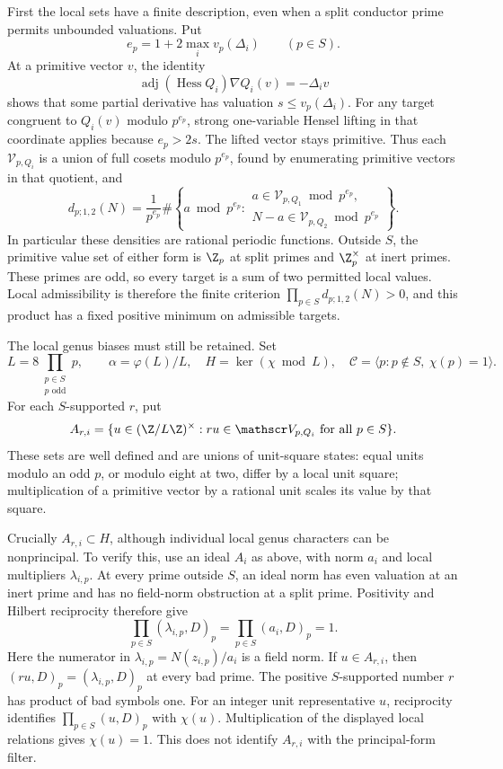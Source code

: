 First the local sets have a finite description, even when a split
conductor prime permits unbounded valuations. Put
\[
 e_p=1+2\max_i v_p(\Delta_i)\qquad(p\in S).
\]
At a primitive vector \(v\), the identity
\[
 \operatorname{adj}(\operatorname{Hess}Q_i)\nabla Q_i(v)
                  =-\Delta_i v
\]
shows that some partial derivative has valuation
\(s\le v_p(\Delta_i)\). For any target congruent to \(Q_i(v)\)
modulo \(p^{e_p}\), strong one-variable Hensel lifting in that
coordinate applies because \(e_p>2s\). The lifted vector stays
primitive. Thus each \(\mathscr V_{p,Q_i}\) is a union of full
cosets modulo \(p^{e_p}\), found by enumerating primitive vectors
in that quotient, and
\begin{equation}\label{eq:norm-local-density-finite}
 d_{p;1,2}(N)=\frac1{p^{e_p}}
 \#\left\{a\bmod p^{e_p}:
 \begin{array}{l}
 a\in\mathscr V_{p,Q_1}\bmod p^{e_p},\\
 N-a\in\mathscr V_{p,Q_2}\bmod p^{e_p}
 \end{array}\right\}.
\end{equation}
In particular these densities are rational periodic functions.
Outside \(S\), the primitive value set of either form is \(\Z_p\)
at split primes and \(\Z_p^\times\) at inert primes. These primes
are odd, so every target is a sum of two permitted local values.
Local admissibility is therefore the finite criterion
\(\prod_{p\in S}d_{p;1,2}(N)>0\), and this product has a fixed
positive minimum on admissible targets.

The local genus biases must still be retained. Set
\[
 L=8\prod_{\substack{p\in S\\p\text{ odd}}}p,\qquad
 \alpha=\varphi(L)/L,\quad H=\ker(\chi\bmod L),\quad
 \mathcal C=\langle p:p\notin S,\ \chi(p)=1\rangle.
\]
For each \(S\)-supported \(r\), put
\[
 A_{r,i}=\{u\in(\Z/L\Z)^\times:
                      ru\in\mathscr V_{p,Q_i}\text{ for all }p\in S\}.
\]
These sets are well defined and are unions of unit-square states:
equal units modulo an odd \(p\), or modulo eight at two, differ
by a local unit square; multiplication of a primitive vector by a
rational unit scales its value by that square.

Crucially \(A_{r,i}\subset H\), although individual local genus
characters can be nonprincipal. To verify this, use an ideal \(A_i\)
as above, with norm \(a_i\) and local multipliers \(\lambda_{i,p}\).
At every prime outside \(S\), an ideal norm has even valuation at
an inert prime and has no field-norm obstruction at a split prime.
Positivity and Hilbert reciprocity therefore give
\[
 \prod_{p\in S}(\lambda_{i,p},D)_p
      =\prod_{p\in S}(a_i,D)_p=1.
\]
Here the numerator in \(\lambda_{i,p}=N(z_{i,p})/a_i\) is a
field norm. If \(u\in A_{r,i}\), then
\((ru,D)_p=(\lambda_{i,p},D)_p\) at every bad prime.
The positive \(S\)-supported number \(r\) has product of bad
symbols one. For an integer unit representative \(u\), reciprocity
identifies \(\prod_{p\in S}(u,D)_p\) with \(\chi(u)\).
Multiplication of the displayed local relations gives \(\chi(u)=1\).
This does not identify \(A_{r,i}\) with the principal-form filter.

